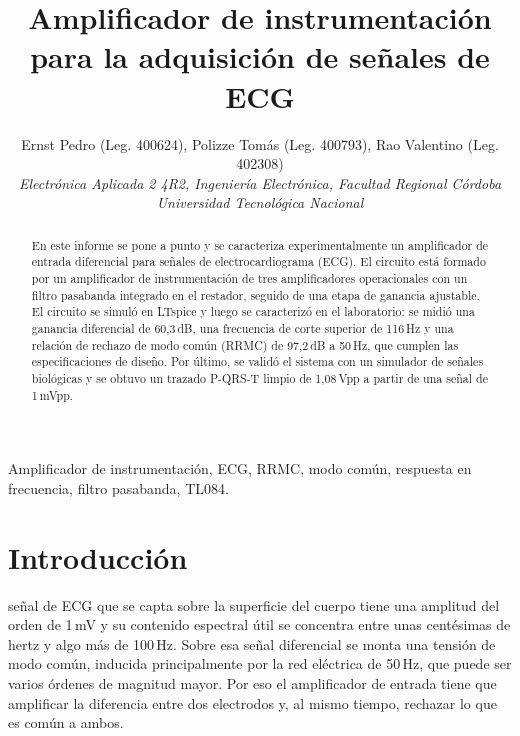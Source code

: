 \documentclass[journal,a4paper]{IEEEtran}
\begin{document}
\title{Amplificador de instrumentación para la adquisición de señales de ECG}

\author{Ernst Pedro (Leg. 400624), Polizze Tomás (Leg. 400793), Rao Valentino (Leg. 402308)\\
\textit{Electrónica Aplicada 2 4R2, Ingeniería Electrónica, Facultad Regional Córdoba}\\
\textit{Universidad Tecnológica Nacional}}

\maketitle

\begin{abstract}
En este informe se pone a punto y se caracteriza experimentalmente un amplificador de entrada diferencial para señales de electrocardiograma (ECG). El circuito está formado por un amplificador de instrumentación de tres amplificadores operacionales con un filtro pasabanda integrado en el restador, seguido de una etapa de ganancia ajustable. El circuito se simuló en LTspice y luego se caracterizó en el laboratorio: se midió una ganancia diferencial de 60,3\,dB, una frecuencia de corte superior de 116\,Hz y una relación de rechazo de modo común (RRMC) de 97,2\,dB a 50\,Hz, que cumplen las especificaciones de diseño. Por último, se validó el sistema con un simulador de señales biológicas y se obtuvo un trazado P-QRS-T limpio de 1,08\,Vpp a partir de una señal de 1\,mVpp.
\end{abstract}

\begin{IEEEkeywords}
Amplificador de instrumentación, ECG, RRMC, modo común, respuesta en frecuencia, filtro pasabanda, TL084.
\end{IEEEkeywords}

\section{Introducción}

 señal de ECG que se capta sobre la superficie del cuerpo tiene una amplitud del orden de 1\,mV y su contenido espectral útil se concentra entre unas centésimas de hertz y algo más de 100\,Hz. Sobre esa señal diferencial se monta una tensión de modo común, inducida principalmente por la red eléctrica de 50\,Hz, que puede ser varios órdenes de magnitud mayor. Por eso el amplificador de entrada tiene que amplificar la diferencia entre dos electrodos y, al mismo tiempo, rechazar lo que es común a ambos.
\end{document}
